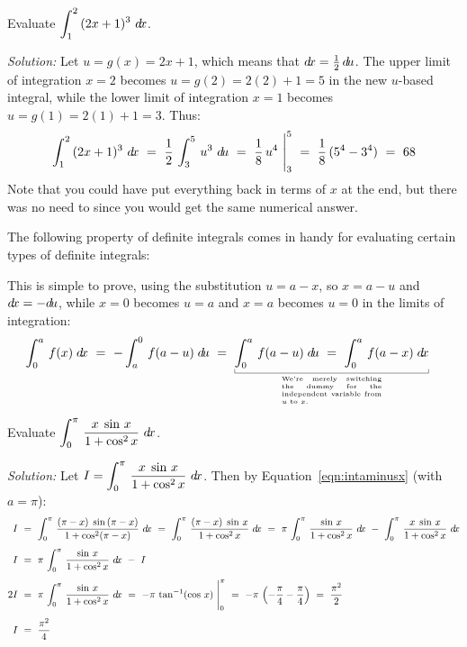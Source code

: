\begin{exmp}\label{exmp:subst11}
\noindent Evaluate $\displaystyle\int_1^2\,(2x+1)^3~d\!x$.\vspace{1mm}
\par\noindent\emph{Solution:} Let $u = g(x) = 2x+1$, which means that
$d\!x = \frac{1}{2}\,d\!u$. The upper limit of integration $x=2$
becomes $u=g(2)=2(2)+1=5$ in the new $u$-based integral, while the lower
limit of integration $x=1$ becomes $u=g(1)=2(1)+1=3$. Thus:
\[
\int_1^2\,(2x+1)^3~d\!x ~=~ \frac{1}{2}\,\int_3^5\,u^3~d\!u ~=~
\frac{1}{8}\,u^4~\Biggr|_3^{5} ~=~ \frac{1}{8}\,(5^4 - 3^4) ~=~ 68
\]
Note that you could have put everything back in terms of $x$ at the end,
but there was no need to since you would get the same numerical answer.
\end{exmp}
\divider
\newpage
The following property of definite integrals comes in handy for evaluating
certain types of definite integrals:


This is simple to prove, using the substitution $u = a - x$, so $x = a - u$ and
$d\!x = -d\!u$, while $x=0$ becomes $u=a$ and $x=a$ becomes $u=0$ in the limits of
integration:
\begin{displaymath}
 \int_0^a \,f(x)\;\dx ~=~ -\int_a^0 \,f(a-u)\;\du ~=~ \underbracket[0.3pt]{\int_0^a \,f(a-u)\;\du ~=~
   \int_0^a \,f(a-x)\;\dx}_{\begin{minipage}[t]{0.23\linewidth}
   \tiny We're merely switching the dummy for the independent variable from $u$ to $x$.
 \end{minipage}} \quad\checkmark
\end{displaymath}

\begin{exmp}\label{exmp:subst12}
\noindent Evaluate $\displaystyle\int_0^{\pi}\,\dfrac{x\;\sin\,x}{1 + \cos^2 x}~d\!x$.\vspace{1mm}
\par\noindent\emph{Solution:} Let $I = \displaystyle\int_0^{\pi}\,\dfrac{x\;\sin\,x}{1 + \cos^2 x}~d\!x$.
Then by Equation~\ref{eqn:intaminusx} (with $a = \pi$):
\begin{align*}
 I ~&=~ \int_0^{\pi}\,\frac{(\pi - x)\;\sin\,(\pi - x)}{1 + \cos^2 (\pi -x)}~d\!x
 ~=~ \int_0^{\pi}\,\frac{(\pi - x)\;\sin\,x}{1 + \cos^2 x}~d\!x
 ~=~ \pi\,\int_0^{\pi}\,\frac{\sin\,x}{1 + \cos^2 x}~d\!x ~-~
      \int_0^{\pi}\,\dfrac{x\;\sin\,x}{1 + \cos^2 x}~d\!x\\[4pt]
 I ~&=~ \pi\,\int_0^{\pi}\,\frac{\sin\,x}{1 + \cos^2 x}~d\!x ~-~ I\\[4pt]
 2I ~&=~ \pi\,\int_0^{\pi}\,\frac{\sin\,x}{1 + \cos^2 x}~d\!x ~=~
         -\pi\,\tan^{-1} (\cos\,x)~\Biggr|_{0}^{\pi} ~=~ -\pi\,\left(-\frac{\pi}{4} -
         \frac{\pi}{4}\right) ~=~ \frac{\pi^2}{2}\\[4pt]
 I ~&=~ \frac{\pi^2}{4}
\end{align*}
\end{exmp}
\divider
\vspace{3mm}

